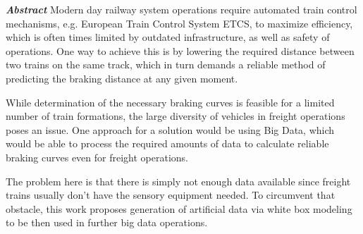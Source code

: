 \clearpage

\par\noindent
\textit{\textbf{Abstract}} Modern day railway system operations require automated train control mechanisms, e.g. European Train Control System ETCS, to maximize efficiency, which is often times limited by outdated infrastructure, as well as safety of operations. One way to achieve this is by lowering the required distance between two trains on the same track, which in turn demands a reliable method of predicting the braking distance at any given moment. 
\par
While determination of the necessary braking curves is feasible for a limited number of train formations, the large diversity of vehicles in freight operations poses an issue. One approach for a solution would be using Big Data, which would be able to process the required amounts of data to calculate reliable braking curves even for freight operations. 
\par
The problem here is that there is simply not enough data available since freight trains usually don't have the sensory equipment needed. To circumvent that obstacle, this work proposes generation of artificial data via white box modeling to be then used in further big data operations.